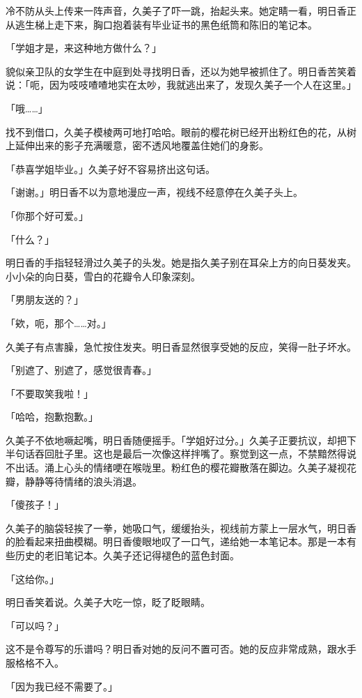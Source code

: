 \documentclass[UTF8]{ctexart}
\begin{document}
    冷不防从头上传来一阵声音，久美子了吓一跳，抬起头来。她定睛一看，明日香正从逃生梯上走下来，胸口抱着装有毕业证书的黑色纸筒和陈旧的笔记本。 

    「学姐才是，来这种地方做什么？」 

    貌似亲卫队的女学生在中庭到处寻找明日香，还以为她早被抓住了。明日香苦笑着说：「呃，因为吱吱喳喳地实在太吵，我就逃出来了，发现久美子一个人在这里。」 

    「哦……」 

    找不到借口，久美子模棱两可地打哈哈。眼前的樱花树已经开出粉红色的花，从树上延伸出来的影子充满暖意，密不透风地覆盖住她们的身影。 

    「恭喜学姐毕业。」久美子好不容易挤出这句话。 

    「谢谢。」明日香不以为意地漫应一声，视线不经意停在久美子头上。 

    「你那个好可爱。」 

    「什么？」 

    明日香的手指轻轻滑过久美子的头发。她是指久美子别在耳朵上方的向日葵发夹。小小朵的向日葵，雪白的花瓣令人印象深刻。 

    「男朋友送的？」 

    「欸，呃，那个……对。」 

    久美子有点害臊，急忙按住发夹。明日香显然很享受她的反应，笑得一肚子坏水。 

    「别遮了、别遮了，感觉很青春。」 

    「不要取笑我啦！」 

    「哈哈，抱歉抱歉。」 

    久美子不依地噘起嘴，明日香随便摇手。「学姐好过分。」久美子正要抗议，却把下半句话吞回肚子里。这也是最后一次像这样拌嘴了。察觉到这一点，不禁黯然得说不出话。涌上心头的情绪哽在喉咙里。粉红色的樱花瓣散落在脚边。久美子凝视花瓣，静静等待情绪的浪头消退。 

    「傻孩子！」 

    久美子的脑袋轻挨了一拳，她吸口气，缓缓抬头，视线前方蒙上一层水气，明日香的脸看起来扭曲模糊。明日香傻眼地叹了一口气，递给她一本笔记本。那是一本有些历史的老旧笔记本。久美子还记得褪色的蓝色封面。 

    「这给你。」 

    明日香笑着说。久美子大吃一惊，眨了眨眼睛。 

    「可以吗？」 

    这不是令尊写的乐谱吗？明日香对她的反问不置可否。她的反应非常成熟，跟水手服格格不入。 

    「因为我已经不需要了。」 
\end{document}
